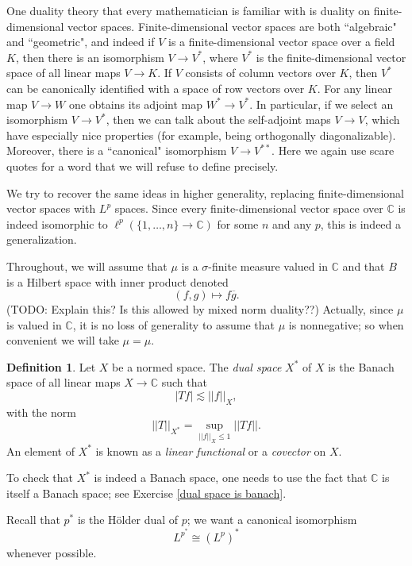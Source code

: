 \documentclass[12pt]{book}
\newcommand{\CC}{\mathbb{C}}
\newcommand{\dfn}[1]{\emph{#1}\index{#1}}
\theoremstyle{definition}
\newtheorem{definition}[theorem]{Definition}
\begin{document}
One duality theory that every mathematician is familiar with is duality on finite-dimensional vector spaces.
Finite-dimensional vector spaces are both ``algebraic" and ``geometric", and indeed if $V$ is a finite-dimensional vector space over a field $K$, then there is an isomorphism $V \to V^*$, where $V^*$ is the finite-dimensional vector space of all linear maps $V \to K$.
If $V$ consists of column vectors over $K$, then $V^*$ can be canonically identified with a space of row vectors over $K$.
For any linear map $V \to W$ one obtains its adjoint map $W^* \to V^*$.
In particular, if we select an isomorphism $V \to V^*$, then we can talk about the self-adjoint maps $V \to V$, which have especially nice properties (for example, being orthogonally diagonalizable).
Moreover, there is a ``canonical" isomorphism $V \to V^{**}$.
Here we again use scare quotes for a word that we will refuse to define precisely.

We try to recover the same ideas in higher generality, replacing finite-dimensional vector spaces with $L^p$ spaces.
Since every finite-dimensional vector space over $\CC$ is indeed isomorphic to $\ell^p(\{1, \dots, n\} \to \CC)$ for some $n$ and any $p$, this is indeed a generalization.

Throughout, we will assume that $\mu$ is a $\sigma$-finite measure valued in $\CC$ and that $B$ is a Hilbert space with inner product denoted
$$(f, g) \mapsto f \overline g.$$
(TODO: Explain this? Is this allowed by mixed norm duality??)
Actually, since $\mu$ is valued in $\CC$, it is no loss of generality to assume that $\mu$ is nonnegative; so when convenient we will take $\mu = \mu$.

\begin{definition}
Let $X$ be a normed space.
The \dfn{dual space} $X^*$ of $X$ is the Banach space of all linear maps $X \to \CC$ such that
\begin{equation}
\label{bounded covector}
|Tf| \lesssim ||f||_X,
\end{equation}
with the norm
$$||T||_{X^*} = \sup_{||f||_X \leq 1} ||Tf||.$$
An element of $X^*$ is known as a \dfn{linear functional} or a \dfn{covector} on $X$.
\end{definition}

To check that $X^*$ is indeed a Banach space, one needs to use the fact that $\CC$ is itself a Banach space; see Exercise \ref{dual space is banach}.

Recall that $p^*$ is the H\"older dual of $p$; we want a canonical isomorphism
$$L^{p^*} \cong (L^p)^*$$
whenever possible.
\end{document}
